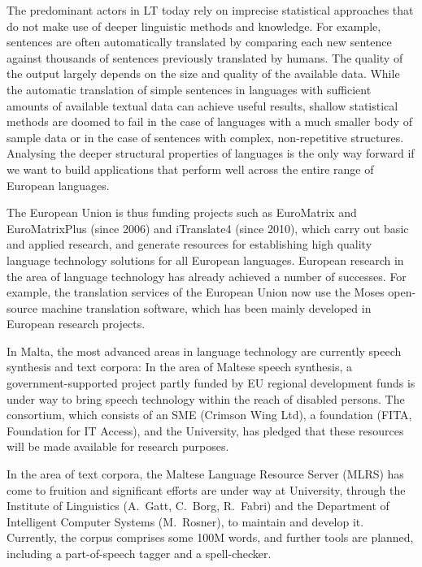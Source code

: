 \begin{multicols}{2}
The predominant actors in LT today rely on imprecise statistical approaches that do not make use of deeper linguistic methods and knowledge. For example, sentences are often automatically translated by comparing each new sentence against thousands of sentences previously translated by humans. The quality of the output largely depends on the size and quality of the available  data. While the automatic translation of simple sentences in languages with sufficient amounts of available textual data can achieve useful results, shallow statistical methods are doomed to fail in the case of languages with a much smaller body of sample data or in the case of sentences with complex, non-repetitive structures. Analysing the deeper structural properties of languages is the only way forward if we want to build applications that perform well across the entire range of European languages.


The European Union is thus funding projects such as EuroMatrix and EuroMatrixPlus (since 2006) and iTranslate4 (since 2010), which carry out basic and applied research, and generate resources for establishing high quality language technology solutions for all European languages. 
European research in the area of language technology has already achieved a number of successes. For example, the translation services of the European Union now use the Moses open-source machine translation software, which has been mainly developed in European research projects. 

In Malta, the most advanced areas in language technology are currently speech synthesis and text corpora: In the area of Maltese speech synthesis, a government-supported project partly funded by EU regional development funds is under way to bring speech technology within the reach of disabled persons. The consortium, which consists of an SME (Crimson Wing Ltd), a foundation (FITA, Foundation for IT Access), and the University, has pledged that these resources will be made available for research purposes. 

In the area of text corpora, the Maltese Language Resource Server (MLRS) has come to fruition and significant efforts are under way at University, through the Institute of Linguistics (A.~Gatt, C.~Borg, R.~Fabri) and the Department of Intelligent Computer Systems (M.~Rosner), to maintain and develop it. Currently, the corpus comprises some 100M words, and further tools are planned, including a part-of-speech tagger and a spell-checker.


\end{multicols}
